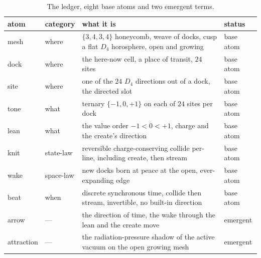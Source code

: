 \begin{table}[ht]
\centering
\begin{tabular}{@{}llll@{}}
\toprule
atom & category & what it is & status \\
\midrule
mesh & where & $\{3,4,3,4\}$ honeycomb, weave of docks, cusp a flat $D_4$ horosphere, open and growing & base atom \\
dock & where & the here-now cell, a place of transit, $24$ sites & base atom \\
site & where & one of the $24$ $D_4$ directions out of a dock, the directed slot & base atom \\
tone & what & ternary $\{-1,0,+1\}$ on each of $24$ sites per dock & base atom \\
lean & what & the value order $-1 < 0 < +1$, charge and the create's direction & base atom \\
knit & state-law & reversible charge-conserving collide per-line, including create, then stream & base atom \\
wake & space-law & new docks born at peace at the open, ever-expanding edge & base atom \\
beat & when & discrete synchronous time, collide then stream, invertible, no built-in direction & base atom \\
arrow & --- & the direction of time, the wake through the lean and the create move & emergent \\
attraction & --- & the radiation-pressure shadow of the active vacuum on the open growing mesh & emergent \\
\bottomrule
\end{tabular}
\caption{The ledger, eight base atoms and two emergent terms.}
\label{tab:ledger}
\end{table}
